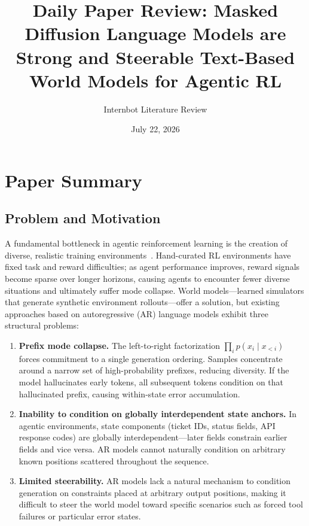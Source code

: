 \documentclass[11pt,a4paper]{article}
\title{Daily Paper Review: Masked Diffusion Language Models are Strong and Steerable Text-Based World Models for Agentic RL}
\author{Internbot Literature Review}
\date{July 22, 2026}
\begin{document}
\maketitle

\section{Paper Summary}

\subsection{Problem and Motivation}

A fundamental bottleneck in agentic reinforcement learning is the creation of diverse, realistic training environments~\cite{deshpande2026masked}. Hand-curated RL environments have fixed task and reward difficulties; as agent performance improves, reward signals become sparse over longer horizons, causing agents to encounter fewer diverse situations and ultimately suffer mode collapse. World models---learned simulators that generate synthetic environment rollouts---offer a solution, but existing approaches based on autoregressive (AR) language models exhibit three structural problems:

\begin{enumerate}
    \item \textbf{Prefix mode collapse.} The left-to-right factorization $\prod_i p(x_i \mid x_{<i})$ forces commitment to a single generation ordering. Samples concentrate around a narrow set of high-probability prefixes, reducing diversity. If the model hallucinates early tokens, all subsequent tokens condition on that hallucinated prefix, causing within-state error accumulation.
    \item \textbf{Inability to condition on globally interdependent state anchors.} In agentic environments, state components (ticket IDs, status fields, API response codes) are globally interdependent---later fields constrain earlier fields and vice versa. AR models cannot naturally condition on arbitrary known positions scattered throughout the sequence.
    \item \textbf{Limited steerability.} AR models lack a natural mechanism to condition generation on constraints placed at arbitrary output positions, making it difficult to steer the world model toward specific scenarios such as forced tool failures or particular error states.
\end{enumerate}
\end{document}
